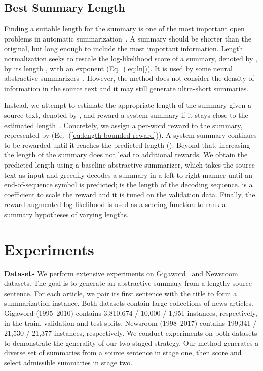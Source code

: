 \documentclass[11pt]{article}
\begin{document}
\subsection{Best Summary Length}

Finding a suitable length for the summary is one of the most important open problems in automatic summarization~\cite{shapira-etal-2018-evaluating,sun-etal-2019-compare}.
A summary should be shorter than the original, but long enough to include the most important information.
Length normalization seeks to rescale the log-likelihood score of a summary, denoted by , by its length , with an exponent  (Eq.~(\ref{eq:ln})).
It is used by some neural abstractive summarizers~\cite{see-etal-2017-get,lewis-etal-2020-bart}.
However, the method does not consider the density of information in the source text and it may still generate ultra-short summaries. 



Instead, we attempt to estimate the appropriate length of the summary given a source text, denoted by , and reward a system summary if it stays close to the estimated length~\cite{huang-etal-2017-finish}.
Concretely, we assign a per-word reward to the summary, represented by  (Eq.~(\ref{eq:length-bounded-reward})).
A system summary continues to be rewarded until it reaches the predicted length ().
Beyond that, increasing the length of the summary does not lead to additional rewards. 
We obtain the predicted length  using a baseline abstractive summarizer, which takes the source text as input and greedily decodes a summary in a left-to-right manner until an end-of-sequence symbol is predicted;  is the length of the decoding sequence.
 is a coefficient to scale the reward and it is tuned on the validation data.
Finally, the reward-augmented log-likelihood  is used as a scoring function to rank all summary hypotheses of varying lengths.



\section{Experiments}


\noindent\textbf{Datasets}\quad
We perform extensive experiments on Gigaword~\cite{Parker:2011} and Newsroom~\cite{grusky-etal-2018-newsroom} datasets.
The goal is to generate an abstractive summary from a lengthy source sentence.
For each article, we pair its first sentence with the title to form a summarization instance.
Both datasets contain large collections of news articles.
Gigaword (1995--2010) contains 3,810,674 / 10,000 / 1,951 instances, respectively, in the train, validation and test splits. Newsroom (1998--2017) contains 199,341 / 21,530 / 21,377 instances, respectively.
We conduct experiments on both datasets to demonstrate the generality of our two-staged strategy.
Our method generates a diverse set of summaries from a source sentence in stage one, then score and select admissible summaries in stage two.
\end{document}
